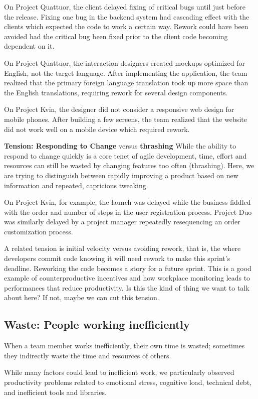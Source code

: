 On Project Quattuor, the client delayed fixing of critical bugs until just before the release. Fixing one bug in the backend system had cascading effect with the clients which expected the code to work a certain way. Rework could have been avoided had the critical bug been fixed prior to the client code becoming dependent on it.

On Project Quattuor, the interaction designers created mockups optimized for English, not the target language. After implementing the application, the team realized that the primary foreign language translation took up more space than the English translations, requiring rework for several design components. 

On Project Kvin, the designer did not consider a responsive web design for mobile phones. After building a few screens, the team realized that the website did not work well on a mobile device which required rework.

\textbf{Tension: Responding to Change} versus \textbf{thrashing}
While the ability to respond to change quickly is a core tenet of agile development, time, effort and resources can still be wasted by changing features too often (thrashing). Here, we are trying to distinguish between rapidly improving a product based on new information and repeated, capricious tweaking. 

On Project Kvin, for example, the launch was delayed while the business fiddled with the order and number of steps in the user registration process. Project Duo was similarly delayed by a project manager repeatedly resequencing an order customization process. 


A related tension is initial velocity versus avoiding rework, that is, the where developers commit code knowing it will need rework to make this sprint's deadline. Reworking the code becomes a story for a future sprint. This is a good example of counterproductive incentives and how workplace monitoring leads to performances that reduce productivity. Is this the kind of thing we want to talk about here? If not, maybe we can cut this tension.


\subsection{Waste: People working inefficiently}
When a team member works inefficiently, their own time is wasted; sometimes they indirectly waste the time and resources of others. 

While many factors could lead to inefficient work, we particularly observed productivity problems related to emotional stress, cognitive load, technical debt, and inefficient tools and libraries.

